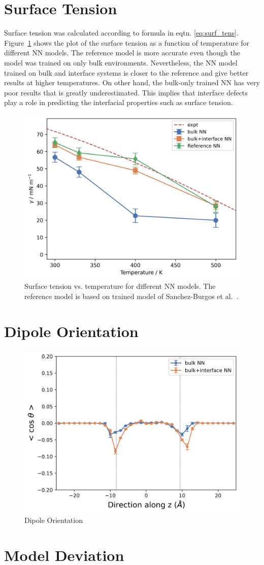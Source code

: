 \section{Surface Tension}
Surface tension was calculated according to formula in eqtn.
\eqref{eq:surf_tens}. Figure~\ref{fig:surf_tens} shows the plot of the surface
tension as a function of temperature for different NN models. The reference
model is more accurate even though the model was trained on only bulk
environments. Nevertheless, the NN model trained on bulk and interface systems
is closer to the reference and give better results at higher temperatures. On
other hand, the bulk-only trained NN has very poor results that is greatly
underestimated. This implies that interface defects play a role in predicting
the interfacial
properties such as surface tension.

\begin{figure}[h!]
  \centering
  \includegraphics[width=0.7\linewidth]{images/surface_tension.png}
  \caption{Surface tension vs. temperature for different NN models. The
    reference model is based on trained model of Sanchez-Burgos et
    al.~\cite{sanchez2023deep}.  }
  \label{fig:surf_tens}
\end{figure}

\section{Dipole Orientation}
\begin{figure}[h!]
  \centering
  \includegraphics[width=0.5\linewidth]{images/dipole_dist.png}
  \caption{Dipole Orientation}
\end{figure}

\section{Model Deviation}

\clearpage
